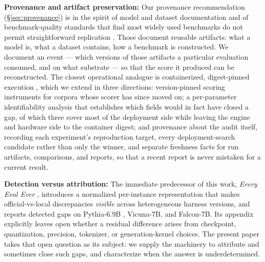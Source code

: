 \textbf{Provenance and artifact preservation:} Our provenance recommendation (\S\ref{sec:provenance}) is in the spirit of model and dataset documentation \citep{mitchell2019modelcards,gebru2021datasheets} and of benchmark-quality standards that find most widely used benchmarks do not permit straightforward replication \citep{reuel2024betterbench}. Those document reusable artifacts: what a model is, what a dataset contains, how a benchmark is constructed. We document an event --- which versions of those artifacts a particular evaluation consumed, and on what substrate --- so that the score it produced can be reconstructed. The closest operational analogue is containerized, digest-pinned execution \citep{boettiger2015docker}, which we extend in three directions: version-pinned scoring instruments for corpora whose scorer has since moved on; a per-parameter identifiability analysis that establishes which fields would in fact have closed a gap, of which three cover most of the deployment side while leaving the engine and hardware side to the container digest; and provenance about the audit itself, recording each experiment's reproduction target, every deployment-search candidate rather than only the winner, and separate freshness facts for run artifacts, comparisons, and reports, so that a recent report is never mistaken for a current result.

\textbf{Detection versus attribution:} The immediate predecessor of this work, \textit{Every Eval Ever} \citep{eee2026}, introduces a normalized per-instance representation that makes official-vs-local discrepancies \emph{visible} across heterogeneous harness versions, and reports detected gaps on Pythia-6.9B \citep{biderman2023pythia}, Vicuna-7B, and Falcon-7B. Its appendix explicitly leaves open whether a residual difference arises from checkpoint, quantization, precision, tokenizer, or generation-kernel choices. The present paper takes that open question as its subject: we supply the machinery to attribute and sometimes close such gaps, and characterize when the answer is underdetermined.